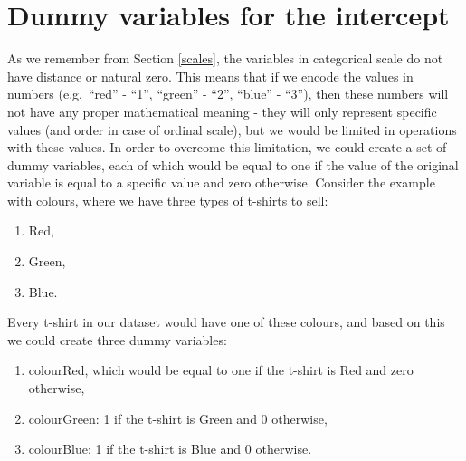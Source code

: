 \documentclass[
]{book}
\providecommand{\tightlist}{%
  \setlength{\itemsep}{0pt}\setlength{\parskip}{0pt}}
\theoremstyle{definition}
\theoremstyle{definition}
\theoremstyle{definition}
\theoremstyle{definition}
\theoremstyle{remark}
\begin{document}
\section{Dummy variables for the intercept}\label{dummy-variables-for-the-intercept}

As we remember from Section \ref{scales}, the variables in categorical scale do not have distance or natural zero. This means that if we encode the values in numbers (e.g.~``red'' - ``1'', ``green'' - ``2'', ``blue'' - ``3''), then these numbers will not have any proper mathematical meaning - they will only represent specific values (and order in case of ordinal scale), but we would be limited in operations with these values. In order to overcome this limitation, we could create a set of dummy variables, each of which would be equal to one if the value of the original variable is equal to a specific value and zero otherwise. Consider the example with colours, where we have three types of t-shirts to sell:

\begin{enumerate}
\def\labelenumi{\arabic{enumi}.}
\tightlist
\item
  Red,
\item
  Green,
\item
  Blue.
\end{enumerate}

Every t-shirt in our dataset would have one of these colours, and based on this we could create three dummy variables:

\begin{enumerate}
\def\labelenumi{\arabic{enumi}.}
\tightlist
\item
  colourRed, which would be equal to one if the t-shirt is Red and zero otherwise,
\item
  colourGreen: 1 if the t-shirt is Green and 0 otherwise,
\item
  colourBlue: 1 if the t-shirt is Blue and 0 otherwise.
\end{enumerate}
\end{document}
